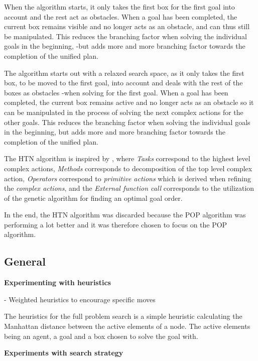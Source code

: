 \documentclass[Main]{subfiles}
\begin{document}
When the algorithm starts, it only takes the first box for the first goal into account and the rest act as obstacles. When a goal has been completed, the current box remains visible and no longer acts as an obstacle, and can thus still be manipulated. This reduces the branching factor when solving the individual goals in the beginning, -but adds more and more branching factor towards the completion of the unified plan.

The algorithm starts out with a relaxed search space, as it only takes the first box, to be moved to the first goal, into account and deals with the rest of the boxes as obstacles -when solving for the first goal.
When a goal has been completed, the current box remains active and no longer acts as an obstacle so it can be manipulated in the process of solving the next complex actions for the other goals.
This reduces the branching factor when solving the individual goals in the beginning, but adds more and more branching factor towards the completion of the unified plan.

The HTN algorithm is inspired by \cite{nau2003shop2}, where \textit{Tasks} correspond to the highest level complex actions, \textit{Methods} corresponds to decomposition of the top level complex action, \textit{Operators} correspond to \textit{primitive actions} which is derived when refining the \textit{complex actions}, and the \textit{External function call} corresponds to the utilization of the genetic algorithm for finding an optimal goal order.

In the end, the HTN algorithm was discarded because the POP algorithm was performing a lot better and it was therefore chosen to focus on the POP algorithm.


\subsection{General}


\textbf{Experimenting with heuristics}

- Weighted heuristics to encourage specific moves

The heuristics for the full problem search is a simple heuristic calculating the Manhattan distance between the active elements of a node. The active elements being an agent, a goal and a box chosen to solve the goal with. 




\textbf{Experiments with search strategy}


\end{document}
